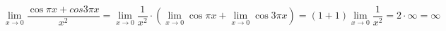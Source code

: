 {}

$$
  \lim_{x\to0} \frac{\cos\pi{x}+cos3\pi{x}}{x^2}
= \lim_{x\to0} \frac{1}{x^2}  \cdot  (\lim_{x\to0}\cos\pi{x} + \lim_{x\to0} \cos3\pi{x} )
= (1 + 1 ) \lim_{x\to0} \frac{1}{x^2} = 2 \cdot \infty = \infty
$$
